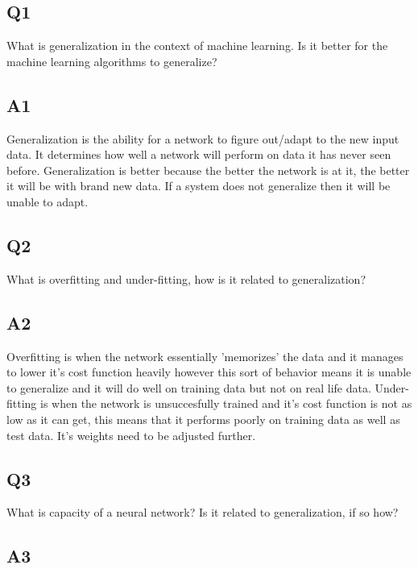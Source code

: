 \documentclass[a4paper, 12pt]{article}
\begin{document}
    \subsection{Q1}

    What is generalization in the context of machine learning. Is it better for the machine learning algorithms to generalize?

    \subsection{A1}

    Generalization is the ability for a network to figure out/adapt to the new input data. It determines how well a network will perform on data it has never seen before. Generalization is better because the better the network is at it, the better it will be with brand new data. If a system does not generalize then it will be unable to adapt.

    \subsection{Q2}

    What is overfitting and under-fitting, how is it related to generalization?
    
    \subsection{A2}

    Overfitting is when the network essentially 'memorizes' the data and it manages to lower it's cost function heavily however this sort of behavior means it is unable to generalize and it will do well on training data but not on real life data.
    Under-fitting is when the network is unsuccesfully trained and it's cost function is not as low as it can get, this means that it performs poorly on training data as well as test data. It's weights need to be adjusted further. 

    \subsection{Q3}

    What is capacity of a neural network? Is it related to generalization, if so how?

    \subsection{A3}
\end{document}
